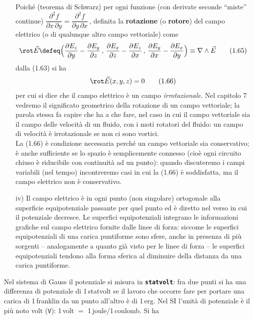 \begin{itemize}
\begin{equation}
\tag{1.64}
\end{equation}
Poiché (teorema di Schwarz) per ogni funzione (con derivate seconde ``miste'' continue) $\dfrac{\partial^2f}{\partial x\,\partial y}=\dfrac{\partial^2f}{\partial y\,\partial x}$\,, definita la \textbf{rotazione} (o \textbf{rotore}) del campo elettrico (o di qualunque altro campo vettoriale) come
\begin{equation}
\rot\vec E\defeq\Big(\frac{\partial E_z}{\partial y}-\frac{\partial E_y}{\partial z}\,,\,\frac{\partial E_x}{\partial z}-\frac{\partial E_z}{\partial x}\,,\,\frac{\partial E_y}{\partial x}-\frac{\partial E_x}{\partial y}\Big)\equiv\nabla\wedge\vec E
\tag{1.65}
\end{equation}
dalla (1.63) si ha
\begin{equation}
\rot\vec E(x,y,z)=0
\tag{1.66}
\end{equation}
per cui si dice che il campo elettrico è un campo \emph{irrotazionale}. Nel capitolo 7 vedremo il significato geometrico della rotazione di un campo vettoriale; la parola stessa fa capire che ha a che fare, nel caso in cui il campo vettoriale sia il campo delle velocità di un fluido, con i moti rotatori del fluido: un campo di velocità è irrotazionale se non ci sono vortici.\\
La (1.66) è condizione necessaria perché un campo vettoriale sia conservativo; è anche sufficiente se lo spazio è semplicemente connesso (cioè ogni circuito chiuso è riducibile con continuità ad un punto): quando discuteremo i campi variabili (nel tempo) incontreremo casi in cui la (1.66) è soddisfatta, ma il campo elettrico non è conservativo.
\item[iv)] Il campo elettrico è in ogni punto (non singolare) ortogonale alla superficie equipotenziale passante per quel punto ed è diretto nel verso in cui il potenziale decresce. Le superfici equipotenziali integrano le informazioni grafiche sul campo elettrico fornite dalle linee di forza: siccome le superfici equipotenziali di una carica puntiforme sono sfere, anche in presenza di più sorgenti -- analogamente a quanto già
visto per le linee di forza -- le superfici equipotenziali tendono alla forma sferica al diminuire della distanza da una carica puntiforme.
\end{itemize}
Nel sistema di Gauss il potenziale si misura in \texttt{\textbf{statvolt}}: fra due punti si ha una differenza di potenziale di 1\,statvolt se il lavoro che occorre fare per portare una carica di 1\,franklin da un punto all'altro è di 1\,erg. Nel SI l'unità di potenziale è il più noto volt (\texttt{V}): 1\,volt $=$ 1\,joule/1\,coulomb. Si ha
